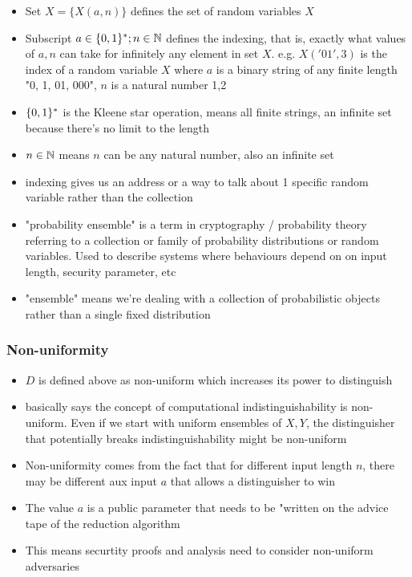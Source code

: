 \begin{itemize}
    \item Set $X = \{X(a,n)\}$ defines the set of random variables $X$
    \item Subscript ${a\in\{0,1\}^*; n \in \mathbb{N}}$ defines the indexing, that is, exactly what values of $a, n$ can take for infinitely any element in set $X$. e.g. $X('01', 3)$ is the index of a random variable $X$ where $a$ is a binary string of any finite length "0, 1, 01, 000", $n$ is a natural number 1,2
    \item $\{0,1\}^*$ is the Kleene star operation, means all finite strings, an infinite set because there's no limit to the length
    \item $n\in\mathbb{N}$ means $n$ can be any natural number, also an infinite set
    \item indexing gives us an address or a way to talk about 1 specific random variable rather than the collection
    \item "probability ensemble" is a term in cryptography / probability theory referring to a collection or family of probability distributions or random variables. Used to describe systems where behaviours depend on on input length, security parameter, etc
    \item "ensemble" means we're dealing with a collection of probabilistic objects rather than a single fixed distribution
\end{itemize}


\subsubsection*{Non-uniformity}
\begin{itemize}
    \item $D$ is defined above as non-uniform which increases its power to distinguish
    \item basically says the concept of computational indistinguishability is non-uniform. Even if we start with uniform ensembles of $X, Y$, the distinguisher that potentially breaks indistinguishability might be non-uniform
    \item Non-uniformity comes from the fact that for different input length $n$, there may be different aux input $a$ that allows a distinguisher to win
    \item The value $a$ is a public parameter that needs to be "written on the advice tape of the reduction algorithm
    \item This means securtity proofs and analysis need to consider non-uniform adversaries 
\end{itemize}

